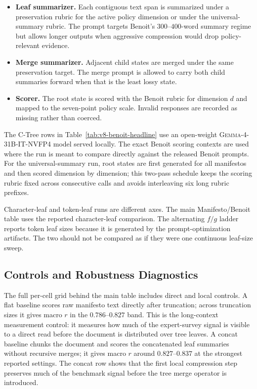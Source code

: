 \begin{itemize}[leftmargin=1.5em]
    \item \textbf{Leaf summarizer.} Each contiguous text span is summarized
          under a preservation rubric for the active policy dimension or under
          the universal-summary rubric. The prompt targets Benoit's
          \(300\)--\(400\)-word summary regime but allows longer outputs when
          aggressive compression would drop policy-relevant evidence.
    \item \textbf{Merge summarizer.} Adjacent child states are merged under the
          same preservation target. The merge prompt is allowed to carry both
          child summaries forward when that is the least lossy state.
    \item \textbf{Scorer.} The root state is scored with the Benoit rubric for
          dimension \(d\) and mapped to the seven-point policy scale. Invalid
          responses are recorded as missing rather than coerced.
\end{itemize}

The C-Tree rows in Table~\ref{tab:v8-benoit-headline} use an open-weight
\textsc{Gemma-4-31B-IT-NVFP4} model served locally. The exact Benoit scoring
contexts are used where the run is meant to compare directly against the
released Benoit prompts. For the universal-summary run, root states are first
generated for all manifestos and then scored dimension by dimension; this
two-pass schedule keeps the scoring rubric fixed across consecutive calls and
avoids interleaving six long rubric prefixes.

Character-leaf and token-leaf runs are different axes. The main
Manifesto/Benoit table uses the reported character-leaf comparison. The
alternating \(f/g\) ladder reports token leaf sizes because it is generated by
the prompt-optimization artifacts. The two should not be compared as if they
were one continuous leaf-size sweep.

\subsection{Controls and Robustness Diagnostics}

The full per-cell grid behind the main table includes direct and local
controls. A flat baseline scores raw manifesto text directly after truncation;
across truncation sizes it gives macro \(r\) in the \(0.786\)--\(0.827\) band.
This is the long-context measurement control: it measures how much of the
expert-survey signal is visible to a direct read before the document is
distributed over tree leaves. A concat baseline chunks the document and scores
the concatenated leaf summaries without recursive merges; it gives macro
\(r\) around \(0.827\)--\(0.837\) at the strongest reported settings. The
concat row shows that the first local compression step preserves much of the
benchmark signal before the tree merge operator is introduced.

